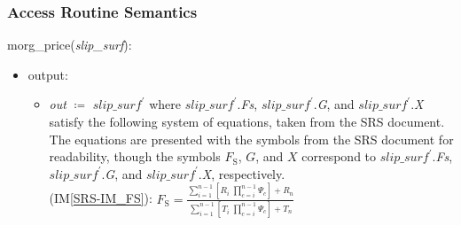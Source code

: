 \documentclass[12pt, titlepage]{article}
\newcommand{\iref}[1]{IM\ref{#1}}
\begin{document}
\subsubsection{Access Routine Semantics}
morg\_price(\textit{slip\_surf}):
\begin{itemize}
	\item output:
	\begin{itemize}
		\item[] \textit{out} $\coloneqq$ $\textit{slip\_surf}^\prime$ where 
		$\textit{slip\_surf}^\prime$.\textit{Fs}, 
		$\textit{slip\_surf}^\prime$.\textit{G}, and 
		$\textit{slip\_surf}^\prime$.\textit{X} satisfy the following system of 
		equations, taken from the SRS document. The equations are presented 
		with the symbols from the SRS document for readability, though the 
		symbols $F_\text{S}$, $G$, and $X$ correspond to 
		$\textit{slip\_surf}^\prime$.\textit{Fs}, 
		$\textit{slip\_surf}^\prime$.\textit{G}, and 
		$\textit{slip\_surf}^\prime$.\textit{X}, respectively.\\
		
		(\iref{SRS-IM_FS}): \( {F_\text{S}}= 
		\frac{\displaystyle\sum_{i=1}^{n-1} \left[ 
		{R_{i}}
			\;{\displaystyle\prod_{c=i}^{n-1} \Psi_{c}
			}\right] + {R_{n}} }{\displaystyle\sum_{i=1}^{n-1} \left[ {T_{i}}
			\;{\displaystyle\prod_{c=i}^{n-1} \Psi_{c}
			}\right] + {T_{n}} } \)\\
		

\end{itemize}
\end{itemize}
\end{document}
